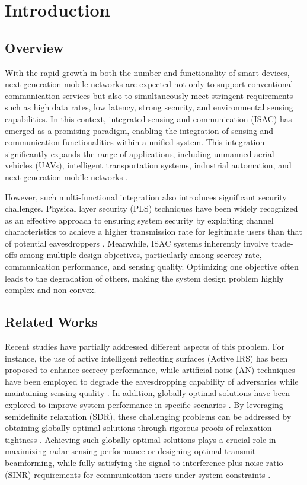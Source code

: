 \documentclass[runningheads]{llncs}
\begin{document}
\section{Introduction}
\subsection{Overview}
With the rapid growth in both the number and functionality of smart devices, next-generation mobile networks are expected not only to support conventional communication services but also to simultaneously meet stringent requirements such as high data rates, low latency, strong security, and environmental sensing capabilities. In this context, integrated sensing and communication (ISAC) has emerged as a promising paradigm, enabling the integration of sensing and communication functionalities within a unified system. This integration significantly expands the range of applications, including unmanned aerial vehicles (UAVs), intelligent transportation systems, industrial automation, and next-generation mobile networks \cite{Liu25Toward, Liu22Survey}.

However, such multi-functional integration also introduces significant security challenges. Physical layer security (PLS) techniques have been widely recognized as an effective approach to ensuring system security by exploiting channel characteristics to achieve a higher transmission rate for legitimate users than that of potential eavesdroppers \cite{Wu22Secure}. Meanwhile, ISAC systems inherently involve trade-offs among multiple design objectives, particularly among secrecy rate, communication performance, and sensing quality. Optimizing one objective often leads to the degradation of others, making the system design problem highly complex and non-convex.

\subsection{Related Works} 
Recent studies have partially addressed different aspects of this problem. For instance, the use of active intelligent reflecting surfaces (Active IRS) has been proposed to enhance secrecy performance, while artificial noise (AN) techniques have been employed to degrade the eavesdropping capability of adversaries while maintaining sensing quality \cite{Bao24Secrecy}. In addition, globally optimal solutions have been explored to improve system performance in specific scenarios \cite{chen2025global, lu19Global}. By leveraging semidefinite relaxation (SDR), these challenging problems can be addressed by obtaining globally optimal solutions through rigorous proofs of relaxation tightness \cite{ren2022optimal}. Achieving such globally optimal solutions plays a crucial role in maximizing radar sensing performance or designing optimal transmit beamforming, while fully satisfying the signal-to-interference-plus-noise ratio (SINR) requirements for communication users under system constraints \cite{ren2023robust}.
\end{document}
